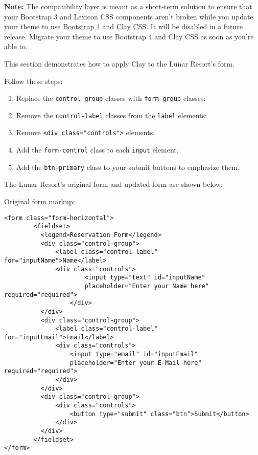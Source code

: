 \noindent\hrulefill

\textbf{Note:} The compatibility layer is meant as a short-term solution
to ensure that your Bootstrap 3 and Lexicon CSS components aren't broken
while you update your theme to use
\href{https://getbootstrap.com/docs/4.3/migration/}{Bootstrap 4} and
\href{https://clayui.com/docs/css-framework/scss.html}{Clay CSS}. It
will be disabled in a future release. Migrate your theme to use
Bootstrap 4 and Clay CSS as soon as you're able to.

\noindent\hrulefill

This section demonstrates how to apply Clay to the Lunar Resort's form.

Follow these steps:

\begin{enumerate}
\def\labelenumi{\arabic{enumi}.}
\item
  Replace the \texttt{control-group} classes with \texttt{form-group}
  classes:
\item
  Remove the \texttt{control-label} classes from the \texttt{label}
  elements:
\item
  Remove \texttt{\textless{}div\ class="controls"\textgreater{}}
  elements.
\item
  Add the \texttt{form-control} class to each \texttt{input} element.
\item
  Add the \texttt{btn-primary} class to your submit buttons to emphasize
  them.
\end{enumerate}

The Lunar Resort's original form and updated form are shown below:

Original form markup:

\begin{verbatim}
<form class="form-horizontal">
        <fieldset>
          <legend>Reservation Form</legend>
          <div class="control-group">
              <label class="control-label" for="inputName">Name</label>
              <div class="controls">
                      <input type="text" id="inputName"
                      placeholder="Enter your Name here" required="required">
                  </div>
          </div>
          <div class="control-group">
              <label class="control-label" for="inputEmail">Email</label>
              <div class="controls">
                  <input type="email" id="inputEmail"
                  placeholder="Enter your E-Mail here" required="required">
              </div>
          </div>
          <div class="control-group">
              <div class="controls">
                  <button type="submit" class="btn">Submit</button>
              </div>
          </div>
        </fieldset>
</form>
\end{verbatim}

